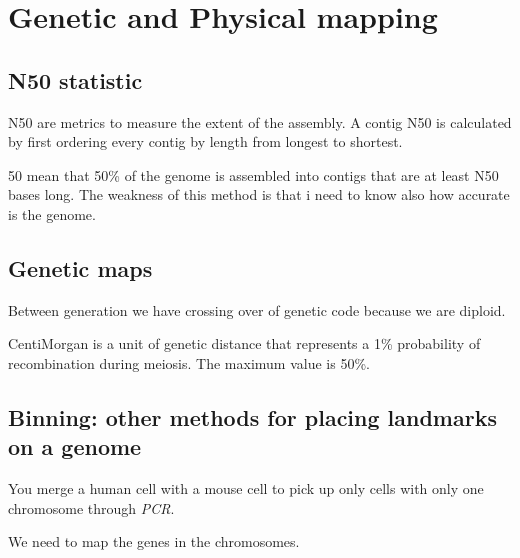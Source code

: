 \section{Genetic and Physical mapping}

\subsection{N50 statistic}
N50 are metrics to measure the extent of the assembly. A contig N50 is 
calculated by first ordering every contig by length from longest to shortest.

50 mean that 50\% of the genome is assembled into contigs that are at least N50 
bases long. The weakness of this method is that i need to know also how 
accurate is the genome.

\subsection{Genetic maps}
Between generation we have crossing over of genetic code because we are diploid.

CentiMorgan is a unit of genetic distance that represents a 1\% probability of 
recombination during meiosis. The maximum value is 50\%.

\subsection{Binning: other methods for placing landmarks on a genome}

You merge a human cell with a mouse cell to pick up only cells with only one 
chromosome through \textit{PCR}.

We need to map the genes in the chromosomes.
